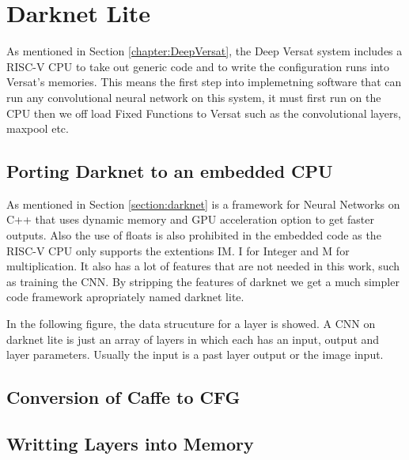 \chapter{Darknet Lite}
\label{chapter:Darknet}

As mentioned in Section \ref{chapter:DeepVersat}, the Deep Versat system includes a RISC-V CPU to take out generic
code and to write the configuration runs into Versat's memories. This means the first step into implemetning software
that can run any convolutional neural network on this system, it must first run on the CPU then we off load Fixed Functions to Versat such as the convolutional layers, maxpool etc.

\section{Porting Darknet to an embedded CPU}

As mentioned in Section \ref{section:darknet} is a framework for Neural Networks on C++ that uses dynamic memory and GPU acceleration option to get faster outputs. Also the use of floats is also prohibited in the embedded code
as the RISC-V CPU only supports the extentions IM. I for Integer and M for multiplication. It also has a lot of features that are not needed in this work, such as training the CNN. By stripping the features of darknet we get a much simpler
code framework apropriately named darknet lite.

In the following figure, the data strucuture for a layer is showed. A CNN on darknet lite is just an array of layers in which each has an input, output and layer parameters. Usually the input is a past layer output or the image input.




\section{Conversion of Caffe to CFG}



\section{Writting Layers into Memory}